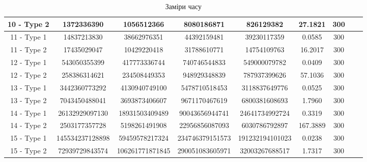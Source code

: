 \documentclass[a4paper,12pt]{article}
\begin{document}
\begin{table}[htp]
\begin{adjustwidth}{-2cm}{}
\begin{tabular}{||c|c|c|c|c|c|c|c|c||}
10 - Type 2 & 1372336390 & 1056512366 & 8080186871 & 826129382 & 27.1821 & 300 && \\ \hline
11 - Type 1 & 14837213830 & 38662976351 & 44392159481 & 39230117359 & 0.0585 & 300 && \\ \hline
11 - Type 2 & 17435029047 & 10429220418 & 31788610771 & 14754109763 & 16.2017 & 300 && \\ \hline
12 - Type 1 & 543050355399 & 417773336744 & 740746544833 & 549000079782 & 0.0409 & 300 && \\ \hline
12 - Type 2 & 258386314621 & 234508449353 & 948929348839 & 787937399626 & 57.1036 & 300 && \\ \hline
13 - Type 1 & 3442360773292 & 4130940749100 & 5478710518453 & 3118837649776 & 0.0525 & 300 && \\ \hline
13 - Type 2 & 7043450488041 & 3693873406607 & 9671170467619 & 6800381608693 & 1.7960 & 300 && \\ \hline
14 - Type 1 & 26132929097130 & 18931503409489 & 90043656944741 & 24641734992724 & 0.3319 & 300 && \\ \hline
14 - Type 2 & 2503177357728 & 5198261491908 & 22956856087093 & 6030786792897 & 167.3889 & 300 && \\ \hline
15 - Type 1 & 145534237128898 & 59459578217324 & 234746379151573 & 191232194101023 & 0.0238 & 300 && \\ \hline
15 - Type 2 & 72939729843574 & 106261771871845 & 290051083605971 & 32003267688517 & 1.7317 & 300 &&\\ \hline
\end{tabular}
\end{adjustwidth}
\caption{Заміри часу}\label{fig:time}
\end{table}
\end{document}
